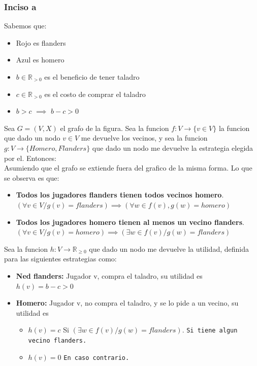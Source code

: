 \subsubsection{Inciso a}
Sabemos que:
\begin{itemize}
	\item Rojo es flanders
	\item Azul es homero
	\item $b \in \mathbb{R}_{>0}$ es el beneficio de tener taladro
	\item $c \in \mathbb{R}_{>0}$ es el costo de comprar el taladro
	\item $b > c$ $ \implies $ $ b - c > 0$  
\end{itemize}

Sea $G=(V, X)$ el grafo de la figura. Sea la funcion $f:V \rightarrow \{v \in V\}$ la funcion que dado un nodo $v \in V$ me devuelve los vecinos, y sea la funcion $g:V \rightarrow \{Homero, Flanders\}$ que dado un nodo me devuelve la estrategia elegida por el. Entonces:\\
Asumiendo que el grafo se extiende fuera del grafico de la misma forma. Lo que se observa es que:
\begin{itemize}
	\label{observaciones-grafo}
	\item \textbf{Todos los jugadores flanders tienen todos vecinos homero}. $(\forall v \in V / g(v) = flanders) \implies (\forall w \in f(v), g(w) = homero)$ 

	\item \textbf{Todos los jugadores homero tienen al menos un vecino flanders}. $(\forall v \in V / g(v) = homero) \implies (\exists w \in f(v)/ g(w) = flanders)$ 
\end{itemize}

Sea la funcion $h: V \rightarrow \mathbb{R}_{\geq 0}$ que dado un nodo me devuelve la utilidad, definida para las siguientes estrategias como:
\begin{itemize}
	\item \textbf{Ned flanders:} Jugador v, compra el taladro, su utilidad es $h(v) = b-c > 0$  
	\item \textbf{Homero:} Jugador v, no compra el taladro, y se lo pide a un vecino, su utilidad es
	\begin{itemize}
		\item $h(v) = c$  Si $(\exists w \in f(v)/ g(w) = flanders)$. \texttt{Si tiene algun vecino flanders.}
		\item $h(v) = 0$  \texttt{En caso contrario.}
	\end{itemize}	 
\end{itemize}

